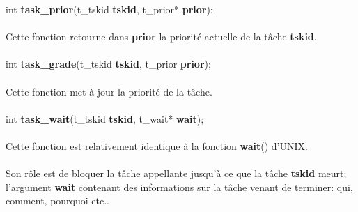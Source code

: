 \documentclass[10pt,a4wide]{article}
\begin{document}
\hspace{1.5cm}int \textbf{task\_prior}(t\_tskid \textbf{tskid},
                                       t\_prior* \textbf{prior});

\paragraph{}

Cette fonction retourne dans \textbf{prior} la priorit\'e actuelle
de la t\^ache \textbf{tskid}.

\paragraph{}

\hspace{1.5cm}int \textbf{task\_grade}(t\_tskid \textbf{tskid},
                                        t\_prior \textbf{prior});

\paragraph{}

Cette fonction met \`a jour la priorit\'e de la t\^ache.

\paragraph{}

\hspace{1.5cm}int \textbf{task\_wait}(t\_tskid \textbf{tskid},
                                      t\_wait* \textbf{wait});

\paragraph{}

Cette fonction est relativement identique \`a la fonction \textbf{wait}()
d'UNIX.

\paragraph{}

Son r\^ole est de bloquer la t\^ache appellante jusqu'\`a ce que la
t\^ache \textbf{tskid} meurt; l'argument \textbf{wait} contenant des
informations sur la t\^ache venant de terminer: qui, comment, pourquoi etc..

\paragraph{}
\end{document}
